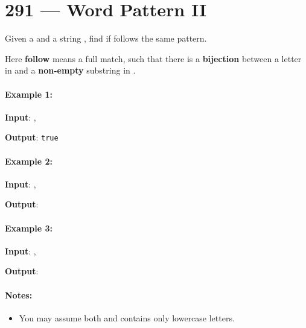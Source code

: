 \section{291 --- Word Pattern II}
Given a  and a string , find if  follows the same pattern.

Here \textbf{follow} means a full match, such that there is a \textbf{bijection} between a letter in  and a \textbf{non-empty} substring in .
\paragraph{Example 1:}
\begin{flushleft}
\textbf{Input}: , 

\textbf{Output}: \texttt{true}
\end{flushleft}

\paragraph{Example 2:}
\begin{flushleft}
\textbf{Input}: , 

\textbf{Output}: 
\end{flushleft}

\paragraph{Example 3:}
\begin{flushleft}
\textbf{Input}: , 

\textbf{Output}: 
\end{flushleft}

\paragraph{Notes:}
\begin{itemize}
\item You may assume both  and  contains only lowercase letters.
\end{itemize}

